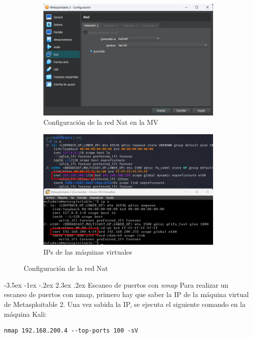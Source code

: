 \documentclass[11pt]{report}
\makeatletter
\renewcommand\chapter{\@startsection{chapter}{0}{\z@}%
    {-3.5ex \@plus -1ex \@minus -.2ex}%
    {2.3ex \@plus.2ex}%
    {\normalfont\Large\bfseries}}
\makeatother
\begin{document}
\begin{figure}[H]
  \begin{subfigure}{0.5\textwidth}
    \centering
    \includegraphics[scale=0.45]{img/red_nat_mv.png}
    \caption{Configuración de la red Nat en la MV}
  \end{subfigure}%
  \begin{subfigure}{0.5\textwidth}
    \centering
    \includegraphics[scale=0.46]{img/red_nat_set.png}
    \caption{IPs de las máquinas virtuales}
  \end{subfigure}
  \caption{Configuración de la red Nat}
\end{figure}

\newpage

\chapter{Escaneo de puertos con \emph{nmap}}
Para realizar un escaneo de puertos con nmap, primero hay que saber la IP de la máquina virtual de Metasploitable 2. Una vez sabida la IP, se ejecuta el siguiente comando en la máquina Kali:
\begin{verbatim}
nmap 192.168.200.4 --top-ports 100 -sV
\end{verbatim}
\end{document}
